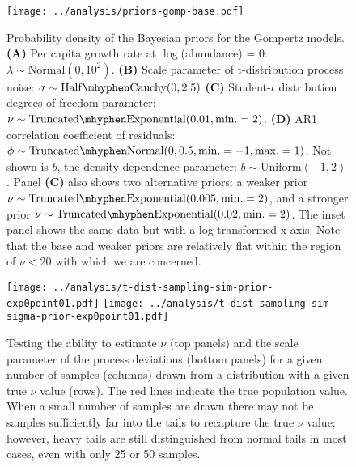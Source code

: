 \documentclass[12pt]{article}
\begin{document}
\begin{figure}[htbp]
\begin{center}
\texttt{[image: ../analysis/priors-gomp-base.pdf]}

\caption{Probability density of the Bayesian priors for the Gompertz models. \textbf{(A)} Per capita growth rate at $\log$(abundance) = $0$: $\lambda \sim \mathrm{Normal}(0, 10^2)$. \textbf{(B)} Scale parameter of t-distribution process noise: $\sigma \sim \mathrm{Half\mhyphen Cauchy} (0, 2.5)$ \textbf{(C)} Student-$t$ distribution degrees of freedom parameter: $\nu \sim \mathrm{Truncated\mhyphen Exponential}(0.01, \mathrm{min.} = 2)$. \textbf{(D)} AR1 correlation coefficient of residuals: $\phi \sim \mathrm{Truncated \mhyphen Normal}(0, 0.5, \mathrm{min.} = -1, \mathrm{max.} = 1)$. Not shown is $b$, the density dependence parameter: $b \sim \mathrm{Uniform}(-1, 2)$. Panel \textbf{(C)} also shows two alternative priors: a weaker prior $\nu \sim \mathrm{Truncated\mhyphen Exponential}(0.005, \mathrm{min.} = 2)$, and a stronger prior $\nu \sim \mathrm{Truncated\mhyphen Exponential}(0.02, \mathrm{min.} = 2)$. The inset panel shows the same data but with a log-transformed x axis. Note that the base and weaker priors are relatively flat within the region of $\nu < 20$ with which we are concerned.}

\label{fig:priors}
\end{center}
\end{figure}

\clearpage

\begin{figure}[htbp]
\begin{center}
\texttt{[image: ../analysis/t-dist-sampling-sim-prior-exp0point01.pdf]}
\texttt{[image: ../analysis/t-dist-sampling-sim-sigma-prior-exp0point01.pdf]}

\caption{Testing the ability to estimate $\nu$ (top panels) and the scale parameter of the process deviations (bottom panels) for a given number of samples (columns) drawn from a distribution with a given true $\nu$ value (rows). The red lines indicate the true population value. When a small number of samples are drawn there may not be samples sufficiently far into the tails to recapture the true $\nu$ value; however, heavy tails are still distinguished from normal tails in most cases, even with only 25 or 50 samples.}

\label{fig:sim-nu}
\end{center}
\end{figure}
\end{document}
